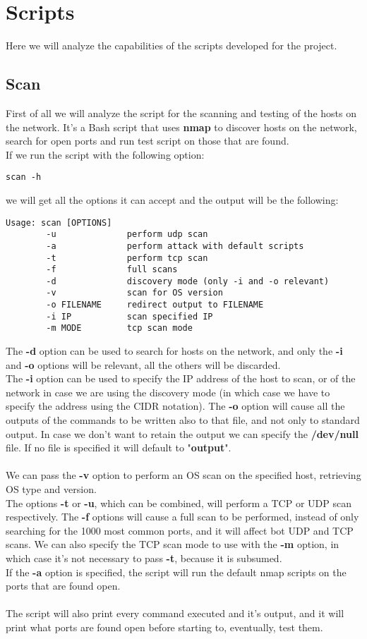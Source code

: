 \chapter{Scripts}
Here we will analyze the capabilities of the scripts developed for the project.
\section{Scan}
First of all we will analyze the script for the scanning and testing of the hosts on 
the network. It's a Bash script that uses \textbf{nmap} to discover hosts on the
network, search for open ports and run test script on those that are found.\\
If we run the script with the following option:
\begin{lstlisting}[numbers=none]
    scan -h
\end{lstlisting}
we will get all the options it can accept and the output will be the following:
\begin{lstlisting}[numbers=none]
    Usage: scan [OPTIONS]
        -u              perform udp scan
        -a              perform attack with default scripts
        -t              perform tcp scan
        -f              full scans
        -d              discovery mode (only -i and -o relevant)
        -v              scan for OS version
        -o FILENAME     redirect output to FILENAME
        -i IP           scan specified IP
        -m MODE         tcp scan mode
\end{lstlisting}
The \textbf{-d} option can be used to search for hosts on the network, and
only the \textbf{-i} and \textbf{-o} options will be relevant, all the others will
be discarded.\\
The \textbf{-i} option can be used to specify the IP address of the host to scan,
or of the network in case we are using the discovery mode (in which case we have to
specify the address using the CIDR notation). The \textbf{-o} option will cause 
all the outputs of the commands to be written also to that file, and not only to standard
output. In case we don't want to retain the output we can specify the \textbf{/dev/null} file.
If no file is specified it will default to "\textbf{output}".\\\\
We can pass the \textbf{-v} option to perform an OS scan on the specified
host, retrieving OS type and version.\\
The options \textbf{-t} or \textbf{-u}, which can be combined,
will perform a TCP or UDP scan respectively. The \textbf{-f} options will cause a full
scan to be performed, instead of only searching for the 1000 most common ports,
and it will affect bot UDP and TCP scans.
We can also specify the TCP scan mode to use with the \textbf{-m} option, in which
case it's not necessary to pass \textbf{-t}, because it is subsumed.\\
If the \textbf{-a} option is specified, the script will run the default nmap scripts
on the ports that are found open.\\\\
The script will also print every command executed and it's output, and it will
print what ports are found open before starting to, eventually, test them.
